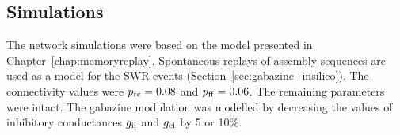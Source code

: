   \subsection{Simulations}
    The network simulations were based on the model presented in
    Chapter~\ref{chap:memoryreplay}. Spontaneous replays of assembly sequences
    are used as a model for the SWR events
    (Section~\ref{sec:gabazine_insilico}). The connectivity values were $p_{\rm
    rc}=0.08$ and $p_{\rm ff}=0.06$. The remaining parameters were intact.  The
    gabazine modulation was modelled by decreasing the values of inhibitory
    conductances $g_{\rm ii}$ and  $g_{\rm ei}$ by 5 or 10\%.
    
